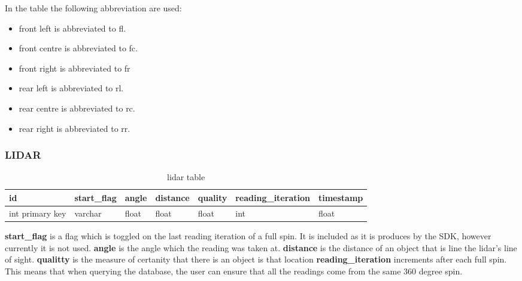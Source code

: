 In the table the following abbreviation are used:
\begin{itemize}
 \item front left is abbreviated to fl.
 \item front centre is abbreviated to fc. 
 \item front right is abbreviated to fr
 \item rear left is abbreviated to rl.
 \item rear centre is abbreviated to rc. 
 \item rear right is abbreviated to rr.
\end{itemize}

\subsubsection{LIDAR}
\iffalse
\gls{LIDAR} data read using SDK (C++)
Changed the output to return a JSON format
Python dictionary in this format...
Small error with the last comma breaking the JSON object so used python \lstinline{data.replace(',\n' , ']')} which replaced the last comma with a ]

Lidar class validates the data
 - removes data (angle) which is obscured by the antenna
\fi



\begin{table}[!htb]
\centering
\caption{lidar table}
\label{my-label}
\begin{tabular}{@{}lllllll@{}}
\toprule
id              & start\_flag & angle & distance & quality & reading\_iteration & timestamp \\ \midrule
int primary key & varchar     & float & float    & float   & int            & float    
\end{tabular}
\end{table}
\textbf{start\_flag} is a flag which is toggled on the last reading iteration of a full spin. It is included as it is produces by the SDK, however currently it is not used. 
\newline
\textbf{angle} is the angle which the reading was taken at. 
\newline
\textbf{distance} is the distance of an object that is line the lidar's line of sight.
\newline
\textbf{qualitty} is the measure of certanity that there is an object is that location
\newline
\textbf{reading\_iteration} increments after each full spin. This means that when querying the database, the user can ensure that all the readings come from the same 360 degree spin.



